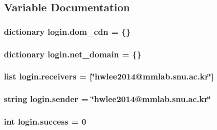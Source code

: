 \subsection{Variable Documentation}
\hypertarget{namespacelogin_a5a1b5b510aa4e7364899bca2d98bfc73}{
\subsubsection[{dom\-\_\-cdn}]{\setlength{\rightskip}{0pt plus 5cm}dictionary login.\-dom\-\_\-cdn = \{\}}}\label{namespacelogin_a5a1b5b510aa4e7364899bca2d98bfc73}
\hypertarget{namespacelogin_ac8b5f0b9048cd35103eaa2642535c676}{
\subsubsection[{net\-\_\-domain}]{\setlength{\rightskip}{0pt plus 5cm}dictionary login.\-net\-\_\-domain = \{\}}}\label{namespacelogin_ac8b5f0b9048cd35103eaa2642535c676}
\hypertarget{namespacelogin_ade3e5984792c8f664dc0de258e3a5cf7}{
\subsubsection[{receivers}]{\setlength{\rightskip}{0pt plus 5cm}list login.\-receivers = \mbox{[}\char`\"{}hwlee2014@mmlab.\-snu.\-ac.\-kr\char`\"{}\mbox{]}}}\label{namespacelogin_ade3e5984792c8f664dc0de258e3a5cf7}
\hypertarget{namespacelogin_ad3176ba8aabb34ee9d462bfc5759e813}{
\subsubsection[{sender}]{\setlength{\rightskip}{0pt plus 5cm}string login.\-sender = \char`\"{}hwlee2014@mmlab.\-snu.\-ac.\-kr\char`\"{}}}\label{namespacelogin_ad3176ba8aabb34ee9d462bfc5759e813}
\hypertarget{namespacelogin_a343cc2be9c464c78c5d4227471e75d58}{
\subsubsection[{success}]{\setlength{\rightskip}{0pt plus 5cm}int login.\-success = 0}}\label{namespacelogin_a343cc2be9c464c78c5d4227471e75d58}
